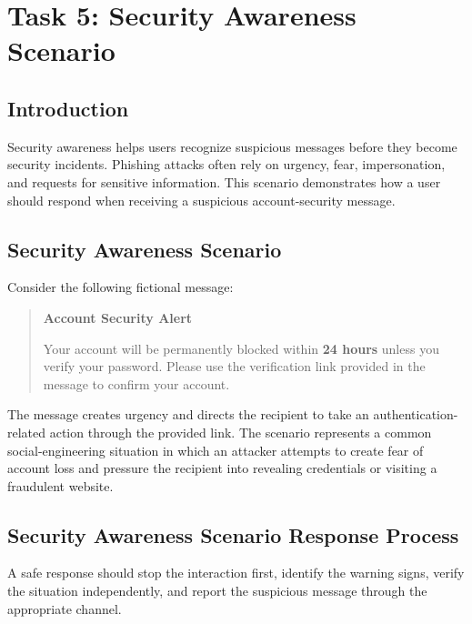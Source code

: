 \documentclass[11pt,a4paper]{article}
\begin{document}
\setcounter{section}{2}


\section{Task 5: Security Awareness Scenario}

\subsection{Introduction}

Security awareness helps users recognize suspicious messages before they become security incidents. Phishing attacks often rely on urgency, fear, impersonation, and requests for sensitive information. This scenario demonstrates how a user should respond when receiving a suspicious account-security message.

\subsection{Security Awareness Scenario}

Consider the following fictional message:

\begin{quote}
\textbf{Account Security Alert}\par
Your account will be permanently blocked within \textbf{24 hours} unless you verify your password. Please use the verification link provided in the message to confirm your account.
\end{quote}

The message creates urgency and directs the recipient to take an authentication-related action through the provided link. The scenario represents a common social-engineering situation in which an attacker attempts to create fear of account loss and pressure the recipient into revealing credentials or visiting a fraudulent website.

\subsection{Security Awareness Scenario Response Process}

A safe response should stop the interaction first, identify the warning signs, verify the situation independently, and report the suspicious message through the appropriate channel.
\end{document}

